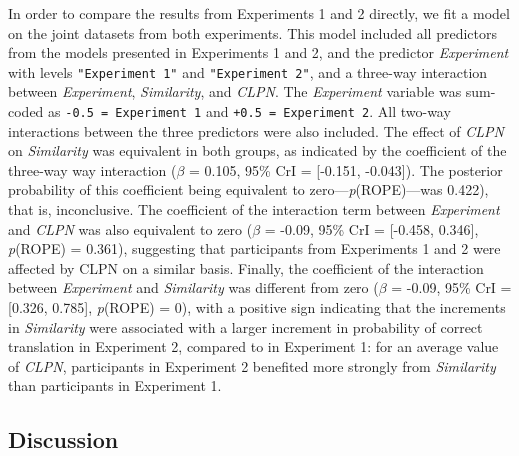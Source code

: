 \documentclass[
  man,
  longtable,
  nolmodern,
  notxfonts,
  notimes,
  colorlinks=true,linkcolor=blue,citecolor=blue,urlcolor=blue]{apa7}
\begin{document}
In order to compare the results from Experiments 1 and 2 directly, we
fit a model on the joint datasets from both experiments. This model
included all predictors from the models presented in Experiments 1 and
2, and the predictor \emph{Experiment} with levels
\texttt{"Experiment\ 1"} and \texttt{"Experiment\ 2"}, and a three-way
interaction between \emph{Experiment}, \emph{Similarity}, and
\emph{CLPN}. The \emph{Experiment} variable was sum-coded as
\texttt{-0.5\ =\ Experiment\ 1} and \texttt{+0.5\ =\ Experiment\ 2}. All
two-way interactions between the three predictors were also included.
The effect of \emph{CLPN} on \emph{Similarity} was equivalent in both
groups, as indicated by the coefficient of the three-way way interaction
(\(\beta\) = 0.105, 95\% CrI = {[}-0.151, -0.043{]}). The posterior
probability of this coefficient being equivalent to
zero---\emph{p}(ROPE)---was 0.422), that is, inconclusive. The
coefficient of the interaction term between \emph{Experiment} and
\emph{CLPN} was also equivalent to zero (\(\beta\) = -0.09, 95\% CrI =
{[}-0.458, 0.346{]}, \emph{p}(ROPE) = 0.361), suggesting that
participants from Experiments 1 and 2 were affected by CLPN on a similar
basis. Finally, the coefficient of the interaction between
\emph{Experiment} and \emph{Similarity} was different from zero
(\(\beta\) = -0.09, 95\% CrI = {[}0.326, 0.785{]}, \emph{p}(ROPE) = 0),
with a positive sign indicating that the increments in \emph{Similarity}
were associated with a larger increment in probability of correct
translation in Experiment 2, compared to in Experiment 1: for an average
value of \emph{CLPN}, participants in Experiment 2 benefited more
strongly from \emph{Similarity} than participants in Experiment 1.

\subsection{Discussion}\label{discussion-1}
\end{document}
